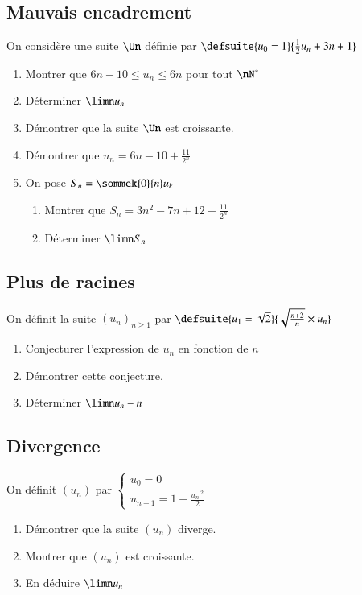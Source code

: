 \documentclass[oneside,12pt]{article}          %
\begin{document}
\subsection{Mauvais encadrement}
On considère une suite $\Un$ définie par $\defsuite{u_0=1}{\frac{1}{2}u_n+3n+1}$
\begin{enumerate}
    \item Montrer que $6n-10\leq u_n\leq6n$ pour tout $\nN^*$
    \item Déterminer $\limn u_n$
    \item Démontrer que la suite $\Un$ est croissante.
    \item Démontrer que $u_n=6n-10+\frac{11}{2^n}$
    \item On pose $S_n=\sommek{0}{n}u_k$
    \begin{enumerate}
    	\item Montrer que $S_n=3n^2-7n+12-\frac{11}{2^n}$
    	\item Déterminer $\limn S_n$
    \end{enumerate}
\end{enumerate}



\subsection{Plus de racines}
On définit la suite $(u_n)_{n\geq1}$ par $\defsuite{u_1=\sqrt{2}}{\sqrt{\frac{n+2}{n}}\times u_n}$
\begin{enumerate}
    \item Conjecturer l'expression de $u_n$ en fonction de $n$
    \item Démontrer cette conjecture.
    \item Déterminer $\limn u_n -n$
\end{enumerate}



\subsection{Divergence}
On définit $(u_n)$ par $\begin{cases}u_0=0\\u_{n+1}=1+\frac{u_n\,^2}{2}\end{cases}$
\begin{enumerate}
	\item Démontrer que la suite $(u_n)$ diverge.
	\item Montrer que $(u_n)$ est croissante.
	\item En déduire $\limn u_n$
\end{enumerate}
\end{document}
